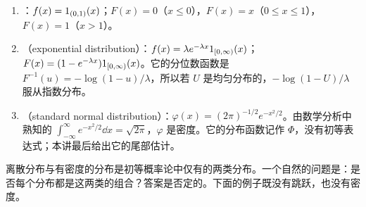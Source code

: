 \begin{example}[三个重要的密度]\label{ex:distributions:densities}
\begin{enumerate}
\item {}：$f(x)=1_{(0,1)}(x)$；$F(x)=0$（$x\leqslant0$），$F(x)=x$（$0\leqslant x\leqslant1$），$F(x)=1$（$x>1$）。
\item {}（exponential distribution）：$f(x)=\lambda e^{-\lambda x}1_{[0,\infty)}(x)$；$F(x)=(1-e^{-\lambda x})1_{[0,\infty)}(x)$。它的分位数函数是 $F^{-1}(u)=-\log(1-u)/\lambda$，所以若 $U$ 是均匀分布的，$-\log(1-U)/\lambda$ 服从指数分布。
\item {}（standard normal distribution）：$\varphi(x)=(2\pi)^{-1/2}e^{-x^2/2}$。由数学分析中熟知的 $\int_{-\infty}^\infty e^{-x^2/2}\dd x=\sqrt{2\pi}$，$\varphi$ 是密度。它的分布函数记作 $\Phi$，没有初等表达式；本讲最后给出它的尾部估计。
\end{enumerate}
\end{example}

离散分布与有密度的分布是初等概率论中仅有的两类分布。一个自然的问题是：是否每个分布都是这两类的组合？答案是否定的。下面的例子既没有跳跃，也没有密度。

